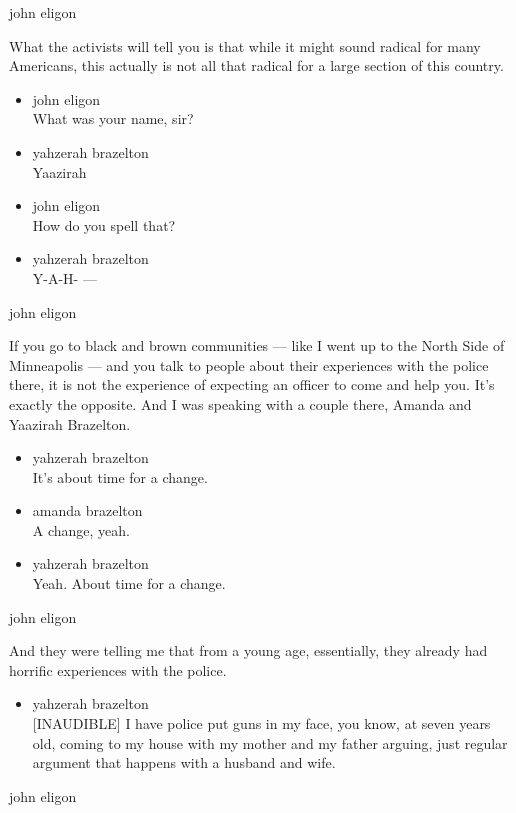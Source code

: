 john eligon

What the activists will tell you is that while it might sound radical
for many Americans, this actually is not all that radical for a large
section of this country.

\begin{itemize}
\item
  john eligon\\
  What was your name, sir?
\item
  yahzerah brazelton\\
  Yaazirah
\item
  john eligon\\
  How do you spell that?
\item
  yahzerah brazelton\\
  Y-A-H- ---
\end{itemize}

john eligon

If you go to black and brown communities --- like I went up to the North
Side of Minneapolis --- and you talk to people about their experiences
with the police there, it is not the experience of expecting an officer
to come and help you. It's exactly the opposite. And I was speaking with
a couple there, Amanda and Yaazirah Brazelton.

\begin{itemize}
\item
  yahzerah brazelton\\
  It's about time for a change.
\item
  amanda brazelton\\
  A change, yeah.
\item
  yahzerah brazelton\\
  Yeah. About time for a change.
\end{itemize}

john eligon

And they were telling me that from a young age, essentially, they
already had horrific experiences with the police.

\begin{itemize}
\tightlist
\item
  yahzerah brazelton\\
  {[}INAUDIBLE{]} I have police put guns in my face, you know, at seven
  years old, coming to my house with my mother and my father arguing,
  just regular argument that happens with a husband and wife.
\end{itemize}

john eligon

